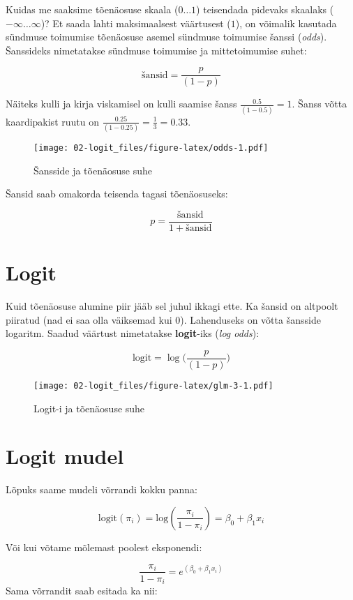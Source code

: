 \documentclass[
]{book}
\begin{document}
Kuidas me saaksime tõenäosuse skaala (\(0 \dots1\)) teisendada pidevaks skaalaks (\(-\infty \dots \infty\))? Et saada lahti maksimaalsest väärtusest (\(1\)), on võimalik kasutada sündmuse toimumise tõenäosuse asemel sündmuse toimumise šanssi (\emph{odds}). Šanssideks nimetatakse sündmuse toimumise ja mittetoimumise suhet:

\[\text{šansid}=\frac{p}{(1-p)}\]

Näiteks kulli ja kirja viskamisel on kulli saamise šanss \(\frac{0.5}{(1-0.5)}=1\). Šanss võtta kaardipakist ruutu on \(\frac{0.25}{(1-0.25)}=\frac{1}{3}=0.33\).

\begin{figure}
\centering
\texttt{[image: 02-logit\_files/figure-latex/odds-1.pdf]}
\caption{\label{fig:odds}Šansside ja tõenäosuse suhe}
\end{figure}

Šansid saab omakorda teisenda tagasi tõenäosuseks:

\[p=\frac{\text{šansid}}{1+\text{šansid}}\]

\hypertarget{logit}{%
\section{Logit}\label{logit}}

Kuid tõenäosuse alumine piir jääb sel juhul ikkagi ette. Ka šansid on altpoolt piiratud (nad ei saa olla väiksemad kui \(0\)). Lahenduseks on võtta šansside logaritm. Saadud väärtust nimetatakse \textbf{logit}-iks (\emph{log odds}):

\[\text{logit}=\log \bigg(\frac{p}{(1-p)}\bigg)\]

\begin{figure}
\centering
\texttt{[image: 02-logit\_files/figure-latex/glm-3-1.pdf]}
\caption{\label{fig:glm-3}Logit-i ja tõenäosuse suhe}
\end{figure}

\hypertarget{logit-mudel}{%
\section{Logit mudel}\label{logit-mudel}}

Lõpuks saame mudeli võrrandi kokku panna:

\[\text{logit}(\pi_i)=\text{log} \left(\dfrac{\pi_i}{1-\pi_i}\right)=\beta_0+\beta_1 x_i\]

Või kui võtame mõlemast poolest eksponendi:

\[\frac{\pi_i}{1-\pi_i}=e^{({\beta_0}+\beta_1 x_i)}\]
Sama võrrandit saab esitada ka nii:
\end{document}
